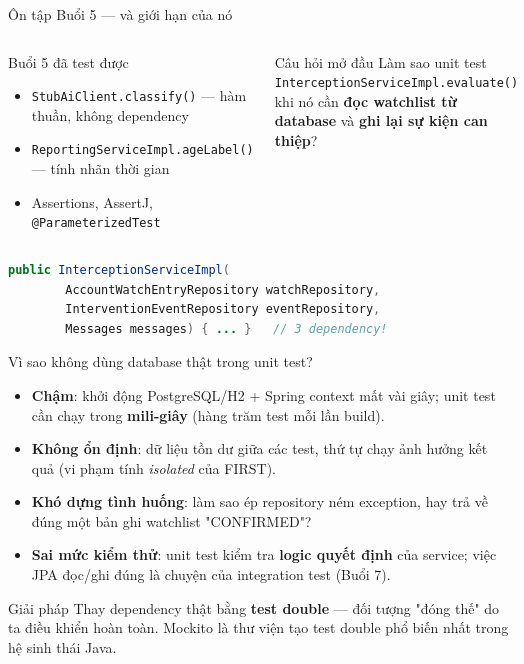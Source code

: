 \documentclass[aspectratio=169,12pt]{beamer}
\begin{document}
\begin{frame}[fragile]{Ôn tập Buổi 5 --- và giới hạn của nó}
  \begin{columns}
    \begin{block}{Buổi 5 đã test được}
      \begin{itemize}\small
        \item \texttt{StubAiClient.classify()} --- hàm thuần, không dependency
        \item \texttt{ReportingServiceImpl\allowbreak.ageLabel()} --- tính nhãn thời gian
        \item Assertions, AssertJ, \texttt{@ParameterizedTest}
      \end{itemize}
    \end{block}

    \begin{alertblock}{Câu hỏi mở đầu}
      \small
      Làm sao unit test
      \texttt{InterceptionServiceImpl\allowbreak.evaluate()} khi nó cần
      \textbf{đọc watchlist từ database} và
      \textbf{ghi lại sự kiện can thiệp}?
    \end{alertblock}
  \end{columns}

  \medskip
\begin{lstlisting}[language=java,basicstyle=\ttfamily\footnotesize]
public InterceptionServiceImpl(
        AccountWatchEntryRepository watchRepository,
        InterventionEventRepository eventRepository,
        Messages messages) { ... }   // 3 dependency!
\end{lstlisting}
\end{frame}

\begin{frame}{Vì sao không dùng database thật trong unit test?}
  \begin{itemize}
    \item \textbf{Chậm}: khởi động PostgreSQL/H2 + Spring context mất vài giây;
      unit test cần chạy trong \textbf{mili-giây} (hàng trăm test mỗi lần build).
    \item \textbf{Không ổn định}: dữ liệu tồn dư giữa các test, thứ tự chạy
      ảnh hưởng kết quả (vi phạm tính \textit{isolated} của FIRST).
    \item \textbf{Khó dựng tình huống}: làm sao ép repository ném
      exception, hay trả về đúng một bản ghi watchlist "CONFIRMED"?
    \item \textbf{Sai mức kiểm thử}: unit test kiểm tra \textbf{logic quyết định}
      của service; việc JPA đọc/ghi đúng là chuyện của integration test (Buổi 7).
  \end{itemize}

  \begin{block}{Giải pháp}
    Thay dependency thật bằng \textbf{test double} --- đối tượng "đóng thế"
    do ta điều khiển hoàn toàn. Mockito là thư viện tạo test double
    phổ biến nhất trong hệ sinh thái Java.
  \end{block}
\end{frame}
\end{document}
